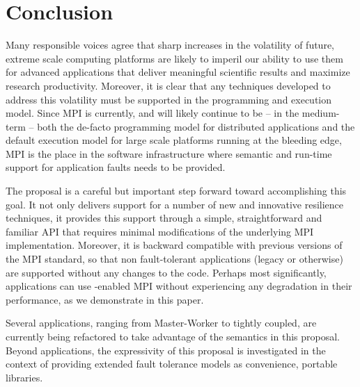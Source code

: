 \section{Conclusion}
\label{sect:conclusion}

\vspace{-0.1cm}Many responsible voices agree that sharp increases in the volatility of future,
extreme scale computing platforms are likely to imperil our ability to use them
for advanced applications that deliver meaningful scientific results and
maximize research productivity. Moreover, it is clear that any techniques
developed to address this volatility must be supported in the programming
and execution model. Since MPI is currently, and will likely continue to be --
in the medium-term -- both the de-facto programming model for distributed
applications and the default execution model for large scale platforms running
at the bleeding edge, MPI is the place in the software infrastructure where semantic
and run-time support for application faults needs to be provided.

The \ulfm proposal is a careful but important step forward toward accomplishing
this goal.  It not only delivers support for a number of new and innovative
resilience techniques, it provides this support through a simple,
straightforward and familiar API that requires minimal modifications of the
underlying MPI implementation. Moreover, it is backward compatible with previous
versions of the MPI standard, so that non fault-tolerant applications (legacy or
otherwise) are supported without any changes to the code. Perhaps most
significantly, applications can use \ulfm-enabled MPI without experiencing any
degradation in their performance, as we demonstrate in this paper.

Several applications, ranging from Master-Worker to tightly coupled, are
currently being refactored to take advantage of the semantics in this
proposal. Beyond applications, the expressivity of this proposal is 
investigated in the context of providing extended fault tolerance 
models as convenience, portable libraries.
